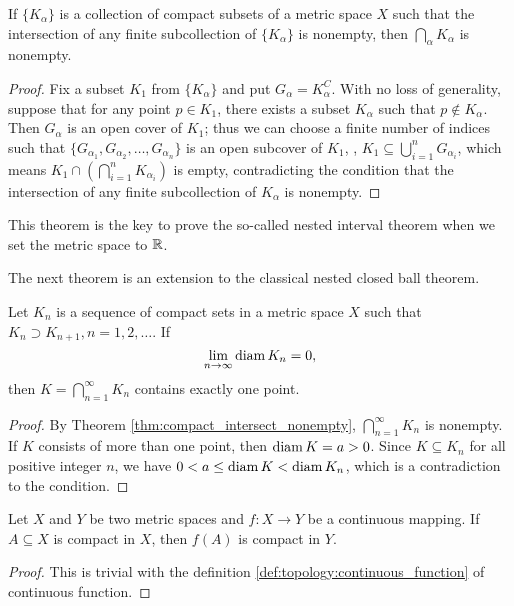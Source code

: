 \begin{thm}
\label{thm:compact_intersect_nonempty}
If $\{K_\alpha\}$ is a collection of compact subsets of a metric space $X$ 
such that the intersection of any finite subcollection of $\{K_\alpha\}$ is 
nonempty, then $\bigcap_{\alpha} K_\alpha$ is nonempty.
\end{thm}
\begin{proof}
Fix a subset $K_1$ from $\{K_\alpha\}$ and put $G_\alpha = K_\alpha ^C$.
With no loss of generality, suppose that for any point $p \in K_1$, there 
exists a subset $K_\alpha$ such that $p \notin K_\alpha$. Then $G_\alpha$
is an open cover of $K_1$; thus we can choose a finite number of indices 
such that $\{G_{\alpha_1}, G_{\alpha_2}, \ldots, G_{\alpha_n}\}$ is an 
open subcover of $K_1$, \ie, $K_1 \subseteq \bigcup_{i = 1}^n G_{\alpha_i}$, 
which means $K_1 \cap (\bigcap _{i = 1}^n K_{\alpha_i})$ is empty, 
contradicting the condition that the intersection of any finite 
subcollection of $K_\alpha$ is nonempty.
\end{proof}

\begin{rmk}
This theorem is the key to prove the so-called nested interval theorem 
when we set the metric space to $\mathbb{R}$.
\end{rmk}

The next theorem is an extension to the classical nested closed ball 
theorem. 
\begin{thm}
Let $K_n$ is a sequence of compact sets in a metric space $X$ such that 
$K_n \supset K_{n+1}, n = 1, 2, \ldots$. If 
\begin{equation}
    \lim_{n \to \infty} \operatorname{diam} K_n = 0, 
\end{equation}
then $K = \bigcap _{n=1}^\infty K_n$ contains exactly one point.
\end{thm}
\begin{proof}
By Theorem \ref{thm:compact_intersect_nonempty}, $\bigcap _{n=1}^\infty K_n$ 
is nonempty. If $K$ consists of more than one point, then $\operatorname{diam} K
= a > 0$. Since $K \subseteq K_n$ for all positive integer $n$, we have 
$0 < a \le \operatorname{diam} K < \operatorname{diam} K_n$, which is a contradiction to 
the condition.
\end{proof}

\begin{thm}
Let $X$ and $Y$ be two metric spaces and $f: X \to Y$ be a continuous 
mapping. 
If $A \subseteq X$ is compact in $X$, then $f(A)$ is compact in $Y$. 
\end{thm}
\begin{proof}
This is trivial with the definition \ref{def:topology:continuous_function} 
of continuous function. 
\end{proof}

